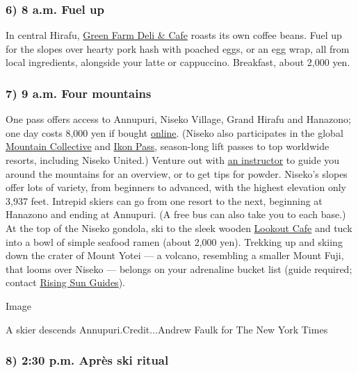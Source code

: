\hypertarget{6-8-am-fuel-up}{%
\subsubsection{6) 8 a.m. Fuel up}\label{6-8-am-fuel-up}}

In central Hirafu, \href{http://www.greenfarmcafe.com}{Green Farm Deli
\& Cafe} roasts its own coffee beans. Fuel up for the slopes over hearty
pork hash with poached eggs, or an egg wrap, all from local ingredients,
alongside your latte or cappuccino. Breakfast, about 2,000 yen.

\hypertarget{7-9-am-four-mountains}{%
\subsubsection{7) 9 a.m. Four mountains}\label{7-9-am-four-mountains}}

One pass offers access to Annupuri, Niseko Village, Grand Hirafu and
Hanazono; one day costs 8,000 yen if bought
\href{https://www.niseko.ne.jp/en/online-liftpass/}{online}. (Niseko
also participates in the global
\href{http://mountaincollective.com}{Mountain Collective} and
\href{http://ikonpass.com}{Ikon Pass}, season-long lift passes to top
worldwide resorts, including Niseko United.) Venture out with
\href{https://www.gosnowniseko.com/}{an instructor} to guide you around
the mountains for an overview, or to get tips for powder. Niseko's
slopes offer lots of variety, from beginners to advanced, with the
highest elevation only 3,937 feet. Intrepid skiers can go from one
resort to the next, beginning at Hanazono and ending at Annupuri. (A
free bus can also take you to each base.) At the top of the Niseko
gondola, ski to the sleek wooden
\href{http://www.niseko-village.com/en/thevillage/on-mountain.html}{Lookout
Cafe} and tuck into a bowl of simple seafood ramen (about 2,000 yen).
Trekking up and skiing down the crater of Mount Yotei --- a volcano,
resembling a smaller Mount Fuji, that looms over Niseko --- belongs on
your adrenaline bucket list (guide required; contact
\href{http://risingsunguides.com/}{Rising Sun Guides}).

Image

A skier descends Annupuri.Credit...Andrew Faulk for The New York Times

\hypertarget{8-230-pm-apruxe8s-ski-ritual}{%
\subsubsection{8) 2:30 p.m. Après ski
ritual}\label{8-230-pm-apruxe8s-ski-ritual}}

